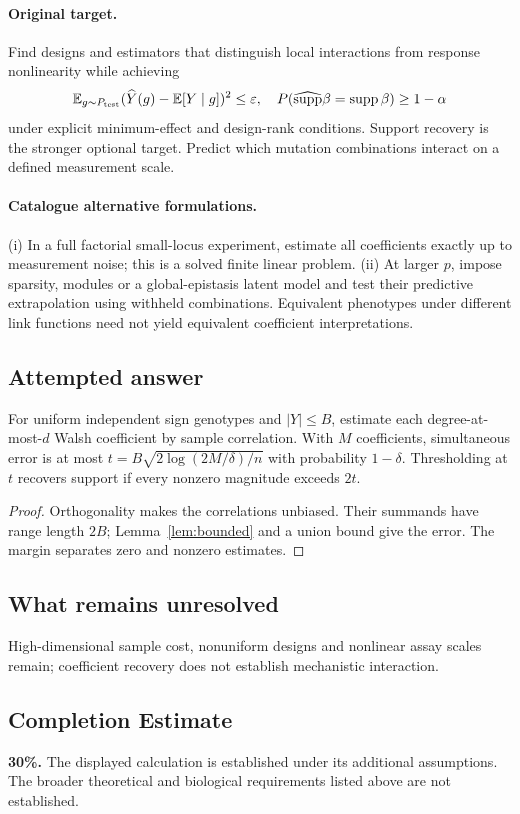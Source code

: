 \documentclass[11pt]{article}
\begin{document}
\paragraph{Original target.}
Find designs and estimators that distinguish local interactions from response nonlinearity while achieving
\[
\mathbb{E}_{g\sim P_{\rm test}}(\widehat Y(g)-\mathbb{E}[Y\mid g])^2\leq\varepsilon,
\quad P(\widehat{\operatorname{supp}}\beta=\operatorname{supp}\beta)\geq1-\alpha
\]
under explicit minimum-effect and design-rank conditions. Support recovery is the stronger optional target. Predict which mutation combinations interact on a defined measurement scale.
\paragraph{Catalogue alternative formulations.}
(i) In a full factorial small-locus experiment, estimate all coefficients exactly up to measurement noise; this is a solved finite linear problem. (ii) At larger $p$, impose sparsity, modules or a global-epistasis latent model and test their predictive extrapolation using withheld combinations. Equivalent phenotypes under different link functions need not yield equivalent coefficient interpretations.
\subsection{Attempted answer}
\begin{proposition}
For uniform independent sign genotypes and $|Y|\leq B$, estimate each degree-at-most-$d$ Walsh coefficient by sample correlation. With $M$ coefficients, simultaneous error is at most $t=B\sqrt{2\log(2M/\delta)/n}$ with probability $1-\delta$. Thresholding at $t$ recovers support if every nonzero magnitude exceeds $2t$.
\end{proposition}
\begin{proof}
Orthogonality makes the correlations unbiased. Their summands have range length $2B$; Lemma~\ref{lem:bounded} and a union bound give the error. The margin separates zero and nonzero estimates.
\end{proof}
\subsection{What remains unresolved}
High-dimensional sample cost, nonuniform designs and nonlinear assay scales remain; coefficient recovery does not establish mechanistic interaction.
\subsection{Completion Estimate}
\textbf{30\%.} The displayed calculation is established under its additional assumptions. The broader theoretical and biological requirements listed above are not established.
\end{document}
